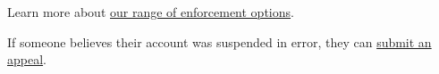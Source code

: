 Learn more about
\href{https://web.archive.org/web/20220905021323/https://help.twitter.com/en/rules-and-policies/enforcement-options.html}{our
range of enforcement options}.

If someone believes their account was suspended in error, they can
\href{https://web.archive.org/web/20220905021323/https://help.twitter.com/forms/general?subtopic=suspended}{submit
an appeal}.
